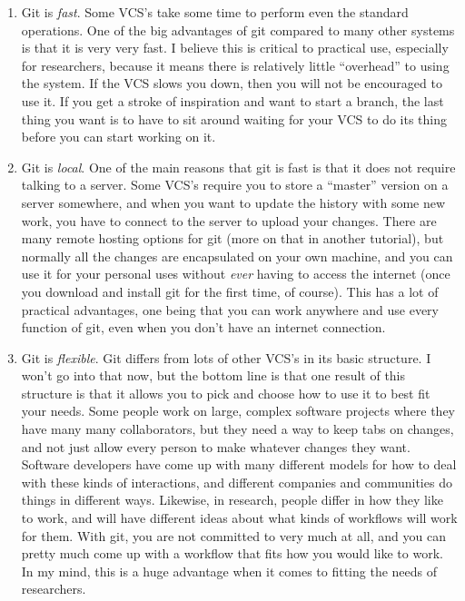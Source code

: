 \documentclass{article}
\begin{document}
\begin{enumerate}
\item Git is \emph{fast}.  Some VCS's take some time to perform even the standard operations. One of the big advantages of git compared to many other systems is that it is very very fast. I believe this is critical to practical use, especially for researchers, because it means there is relatively little ``overhead'' to using the system.  If the VCS slows you down, then you will not be encouraged to use it. If you get a stroke of inspiration and want to start a branch, the last thing you want is to have to sit around waiting for your VCS to do its thing before you can start working on it.
\item Git is \emph{local}. One of the main reasons that git is fast is that it does not require talking to a server. Some VCS's require you to store a ``master'' version on a server somewhere, and when you want to update the history with some new work, you have to connect to the server to upload your changes. There are many remote hosting options for git (more on that in another tutorial), but normally all the changes are encapsulated on your own machine, and you can use it for your personal uses without \emph{ever} having to access the internet (once you download and install git for the first time, of course). This has a lot of practical advantages, one being that you can work anywhere and use every function of git, even when you don't have an internet connection.
\item Git is \emph{flexible}. Git differs from lots of other VCS's in its basic structure. I won't go into that now, but the bottom line is that one result of this structure is that it allows you to pick and choose how to use it to best fit your needs. Some people work on large, complex software projects where they have many many collaborators, but they need a way to keep tabs on changes, and not just allow every person to make whatever changes they want. Software developers have come up with many different models for how to deal with these kinds of interactions, and different companies and communities do things in different ways. Likewise, in research, people differ in how they like to work, and will have different ideas about what kinds of workflows will work for them.  With git, you are not committed to very much at all, and you can pretty much come up with a workflow that fits how you would like to work. In my mind, this is a huge advantage when it comes to fitting the needs of researchers.

\end{enumerate}
\end{document}
